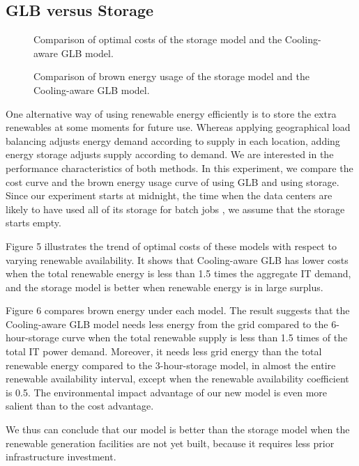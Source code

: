 \documentclass{acm_proc_article-sp}
\begin{document}
\subsection{GLB versus Storage}

\begin{figure}
\centering
{}
\caption{Comparison of optimal costs of the storage model and the Cooling-aware GLB model.}
\end{figure}
\begin{figure}
\centering
{}
\caption{Comparison of brown energy usage of the storage model and the Cooling-aware GLB model.}
\end{figure}
One alternative way of using renewable energy efficiently is to store the extra renewables at some moments for future use. Whereas applying geographical load balancing adjusts energy demand according to supply in each location, adding energy storage adjusts supply according to demand. We are interested in the performance characteristics of both methods. In this experiment, we compare the cost curve and the brown energy usage curve of using GLB and using storage. Since our experiment starts at midnight, the time when the data centers are likely to have used all of its storage for batch jobs \cite{adam:cooling}, we assume that the storage starts empty.

Figure 5 illustrates the trend of optimal costs of these models with respect to varying renewable availability. It shows that Cooling-aware GLB has lower costs when the total renewable energy is less than 1.5 times the aggregate IT demand, and the storage model is better when renewable energy is in large surplus.

Figure 6 compares brown energy under each model. The result suggests that the Cooling-aware GLB model needs less energy from the grid compared to the 6-hour-storage curve when the total renewable supply is less than 1.5 times of the total IT power demand. Moreover, it needs less grid energy than the total renewable energy compared to the 3-hour-storage model, in almost the entire renewable availability interval, except when the renewable availability coefficient is 0.5. The environmental impact advantage of our new model is even more salient than to the cost advantage.

We thus can conclude that our model is better than the storage model when the renewable generation facilities are not yet built, because it requires less prior infrastructure investment.
\end{document}
